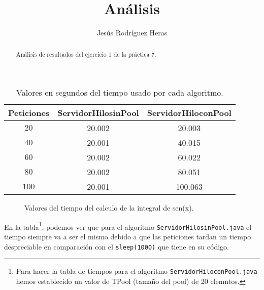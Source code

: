\documentclass[12pt,letterpaper]{article}
\title{Análisis}
\author{Jesús Rodríguez Heras}
\begin{document}
	
	\maketitle
	\begin{abstract} %
		\begin{center}
			Análisis de resultados del ejercicio 1 de la práctica 7.
		\end{center}
	\end{abstract}
	\thispagestyle{empty}
	\newpage
	
	
	
	
	
	\lstset{language=bash, numbers=left, numberstyle=\tiny, numbersep=10pt, firstnumber=1, stepnumber=1, basicstyle=\small\ttfamily, tabsize=1, extendedchars=true, inputencoding=latin1}

\begin{center}
	\begin{table}[htbp]
		\begin{center}
			\begin{tabular}{|c|c|c|}
				\hline
				\textbf{Peticiones} & \textbf{ServidorHilosinPool} & \textbf{ServidorHiloconPool}  \\
				\hline
				$20$ & 20.002 & 20.003  \\ \hline
				$40$ & 20.001 & 40.015  \\ \hline
				$60$ & 20.002 & 60.022  \\ \hline
				$80$ & 20.002 & 80.051  \\ \hline
				$100$ & 20.001 & 100.063  \\ \hline
			\end{tabular}
			\caption{Valores en segundos del tiempo usado por cada algoritmo.}
			\label{tabla:Valores en segundos del tiempo usado por cada algoritmo}
		\end{center}
	\end{table}
\end{center}
\begin{figure}[h]
	\begin{center}
		\caption{Valores del tiempo del calculo de la integral de sen(x).}
		\label{fig:Valores del tiempo del calculo de la integral de sen(x)}
	\end{center}
\end{figure}
\noindent
En la tabla\footnote[1]{Para hacer la tabla de tiempos para el algoritmo \texttt{ServidorHiloconPool.java} hemos establecido un valor de TPool (tamaño del pool) de 20 elemntos.}, podemos ver que para el algoritmo \texttt{ServidorHilosinPool.java} el tiempo siempre va a ser el mismo debido a que las peticiones tardan un tiempo despreciable en comparación con el \texttt{sleep(1000)} que tiene en su código.\\
\end{document}
